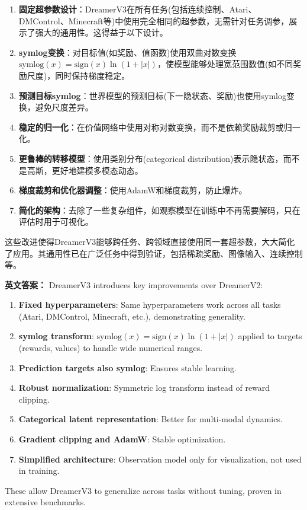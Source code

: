 \documentclass[10pt,a4paper]{ctexart}
\begin{document}
\begin{enumerate}
    \item \textbf{固定超参数设计}：DreamerV3在所有任务(包括连续控制、Atari、DMControl、Minecraft等)中使用完全相同的超参数，无需针对任务调参，展示了强大的通用性。这得益于以下设计。
    \item \textbf{symlog变换}：对目标值(如奖励、值函数)使用双曲对数变换 $\text{symlog}(x) = \text{sign}(x) \ln(1+|x|)$，使模型能够处理宽范围数值(如不同奖励尺度)，同时保持梯度稳定。
    \item \textbf{预测目标symlog}：世界模型的预测目标(下一隐状态、奖励)也使用symlog变换，避免尺度差异。
    \item \textbf{稳定的归一化}：在价值网络中使用对称对数变换，而不是依赖奖励裁剪或归一化。
    \item \textbf{更鲁棒的转移模型}：使用类别分布(categorical distribution)表示隐状态，而不是高斯，更好地建模多模态动态。
    \item \textbf{梯度裁剪和优化器调整}：使用AdamW和梯度裁剪，防止爆炸。
    \item \textbf{简化的架构}：去除了一些复杂组件，如观察模型在训练中不再需要解码，只在评估时用于可视化。
\end{enumerate}

这些改进使得DreamerV3能够跨任务、跨领域直接使用同一套超参数，大大简化了应用。其通用性已在广泛任务中得到验证，包括稀疏奖励、图像输入、连续控制等。

\textbf{英文答案：}  
DreamerV3 introduces key improvements over DreamerV2:
\begin{enumerate}
    \item \textbf{Fixed hyperparameters}: Same hyperparameters work across all tasks (Atari, DMControl, Minecraft, etc.), demonstrating generality.
    \item \textbf{symlog transform}: $\text{symlog}(x) = \text{sign}(x) \ln(1+|x|)$ applied to targets (rewards, values) to handle wide numerical ranges.
    \item \textbf{Prediction targets also symlog}: Ensures stable learning.
    \item \textbf{Robust normalization}: Symmetric log transform instead of reward clipping.
    \item \textbf{Categorical latent representation}: Better for multi-modal dynamics.
    \item \textbf{Gradient clipping and AdamW}: Stable optimization.
    \item \textbf{Simplified architecture}: Observation model only for visualization, not used in training.
\end{enumerate}
These allow DreamerV3 to generalize across tasks without tuning, proven in extensive benchmarks.
\end{document}
